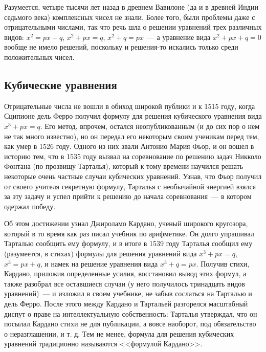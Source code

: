 \documentclass[a4paper,11pt]{scrartcl}
\theoremstyle{plain}
\theoremstyle{definition}
\begin{document}
Разумеется, четыре тысячи лет назад в древнем Вавилоне (да и в древней
Индии седьмого века) комплексных чисел не знали. Более того, были
проблемы даже с отрицательными числами, так что речь шла о решении
уравнений трех различных видов:
$x^2 = px + q$, $x^2 + px = q$, $x^2 + q = px$~--- а уравнение вида
$x^2 + px + q = 0$ вообще не имело решений, поскольку и решения-то
искались только среди положительных чисел.

\subsection{Кубические уравнения}

Отрицательные числа не вошли в обиход широкой публики и к
1515 году, когда Сципионе дель Ферро получил формулу для решения
кубического уравнения вида $x^3 + px = q$. Его метод, впрочем,
остался неопубликованным (и до сих пор о нем не так много известно),
но он передал его некоторым своим ученикам перед тем, как умер в 1526
году.
Одного из них звали Антонио Мария Фьор, и он вошел в историю тем, что
в 1535 году вызвал на соревнование по решению задач Никколо Фонтана 
(по прозвищу Тарталья), который к тому времени научился решать
некоторые очень частные случаи кубических уравнений.
Узнав, что Фьор получил от своего учителя секретную формулу, Тарталья
с необычайной энергией взялся за эту задачу и успел прийти к решению
до начала соревнования~--- в котором одержал победу.

Об этом достижении узнал Джироламо Кардано, ученый широкого кругозора,
который в то время как раз писал учебник по арифметике.
Он долго упрашивал Тарталью сообщить ему формулу, и в итоге в 1539
году Тарталья сообщил ему (разумеется, в стихах) формулы для
решения уравнений вида $x^3 + px = q$, $x^3 = px + q$, и намек на
решение уравнения вида $x^3 + q = px$.
Получив стихи, Кардано, приложив определенные усилия, восстановил
вывод этих формул, а также разобрал все оставшиеся случаи (у него
получилось тринадцать видов уравнений)~--- и
изложил в своем учебнике, не забыв сослаться на Тарталью и дель Ферро.
После этого между Кардано и Тартальей разгорелся масштабный диспут о
праве на интеллектуальную собственность: Тарталья утверждал, что он
посылал Кардано стихи не для публикации, а вовсе наоборот, под
обязательство о неразглашении, и т. д.
Тем не менее, формула для решения кубических уравнений
традиционно называются <<формулой Кардано>>.
\end{document}
